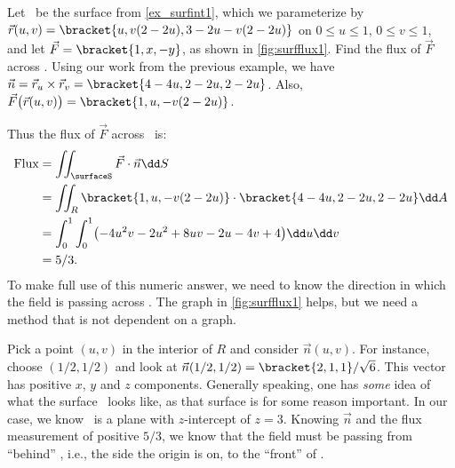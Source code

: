 \begin{example}\label{ex_surfflux1}
Let \surfaceS\ be the surface from \autoref{ex_surfint1}, which we parameterize by $\vec r(u,v) =\bracket{u, v(2-2u),3-2u-v(2-2u)}$ on $0\leq u\leq 1$, $0\leq v\leq 1$, and let $\vec F =\bracket{1, x,-y}$, as shown in \autoref{fig:surfflux1}. Find the flux of $\vec F$ across \surfaceS.
\solution
Using our work from the previous example, we have $\vec n = \vec r_u\times\vec r_v =\bracket{4-4u,2-2u,2-2u}$. Also, $\vec F\bigl(\vec r(u,v)\bigr) =\bracket{1, u, -v(2-2u)}$. 

Thus the flux of $\vec F$ across \surfaceS\ is:
\begin{align*}
	\text{Flux}
	&= \iint_\surfaceS \vec F\cdot \vec n\dd S\\
	&= \iint_R\bracket{1,u,-v(2-2u)}\cdot\bracket{4-4u,2-2u,2-2u}\dd A \\
	&= \int_0^1\int_0^1 \bigl(-4u^2v-2u^2+8uv-2u-4v+4\bigr)\dd u\dd v\\
	&= 5/3.
\end{align*}
To make full use of this numeric answer, we need to know the direction in which the field is passing across \surfaceS. The graph in \autoref{fig:surfflux1} helps, but we need a method that is not dependent on a graph.

Pick a point $(u,v)$ in the interior of $R$ and consider $\vec n(u,v)$. For instance, choose $(1/2,1/2)$ and look at $\vec n(1/2,1/2) =\bracket{2,1,1}/\sqrt{6}$. This vector has positive $x$, $y$ and $z$ components. Generally speaking, one has \emph{some} idea of what the surface \surfaceS\ looks like, as that surface is for some reason important. In our case, we know \surfaceS\ is a plane with $z$-intercept of $z=3$. Knowing $\vec n$ and the flux measurement of positive $5/3$, we know that the field must be passing from ``behind'' \surfaceS, i.e., the side the origin is on, to the ``front'' of \surfaceS.
\end{example}


